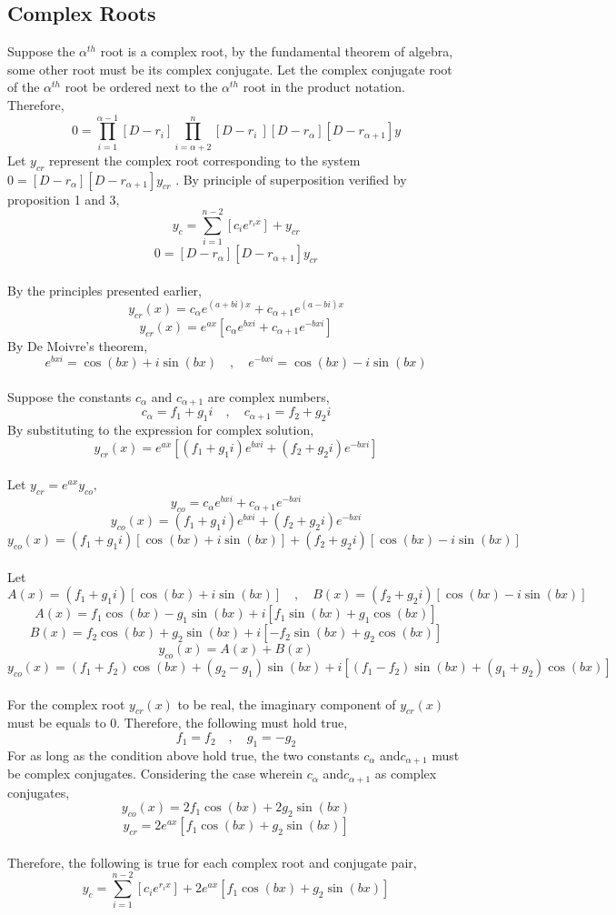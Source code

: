 \subsection{Complex Roots}
\begin{comment}
\end{comment}
Suppose the $\alpha^{th}$ root is a complex root, by the fundamental theorem of algebra, some other root must be its complex conjugate. Let the complex conjugate root of the $\alpha^{th}$ root be ordered next to the $\alpha^{th}$ root in the product notation. Therefore, 
$$0 = \prod_{i = 1}^{\alpha - 1}\left[D - r_i \right]\prod_{i = \alpha + 2}^{n}\left[D - r_i\ \right][D - r_{\alpha}][D - r_{\alpha +1 }]y$$
Let $y_{cr}$ represent the complex root corresponding to the system $0 = [D - r_{\alpha}][D - r_{\alpha +1 }]y_{cr}$ . By principle of superposition verified by proposition 1 and 3, 
$$y_c = \sum_{i = 1}^{n - 2}\left[c_i e^{r_i x}\right] + y_{cr}$$
$$0 = [D - r_{\alpha}][D - r_{\alpha +1 }]y_{cr}$$
\\By the principles presented earlier,
$$y_{cr}(x) = c_{\alpha} e^{(a + bi)x} +c_{\alpha + 1} e^{(a - bi)x}$$
$$y_{cr}(x) = e^{ax}\left[c_{\alpha} e^{bxi} +c_{\alpha + 1} e^{- bxi}\right]$$
By De Moivre's theorem,
$$e^{bxi} = \cos{(bx)} + i\sin{(bx)} \quad, \quad e^{-bxi} = \cos{(bx)} - i\sin{(bx)}$$
\\Suppose the constants $c_{\alpha}$ and $c_{\alpha + 1}$ are complex numbers,
$$c_{\alpha} = f_1 + g_1 i \quad, \quad c_{\alpha + 1} = f_2 + g_2 i$$
By substituting to the expression for complex solution,
$$y_{cr}(x) = e^{ax}\left[(f_1 + g_1 i) e^{bxi} + (f_2 + g_2 i) e^{- bxi}\right]$$
\\Let $y_{cr} = e^{ax} y_{co},$
$$y_{co} = c_{\alpha} e^{bxi} + c_{\alpha + 1} e^{- bxi}$$
$$y_{co}(x) =(f_1 + g_1 i) e^{bxi} + (f_2 + g_2 i) e^{- bxi}$$
$$y_{co}(x) =(f_1 + g_1 i)[\cos{(bx)} + i\sin{(bx)}]  + (f_2 + g_2 i) [\cos{(bx)} - i\sin{(bx)}]$$
\\Let
$$A(x) = (f_1 + g_1 i)[\cos{(bx)} + i\sin{(bx)}]\quad , \quad B(x) = (f_2 + g_2 i) [\cos{(bx)} - i\sin{(bx)}]$$
$$A(x) = f_1\cos{(bx)} - g_1 \sin{(bx)} + i[f_1\sin{(bx)} + g_1\cos{(bx)}]$$
$$ B(x) = f_2\cos{(bx)} + g_2 \sin{(bx)} + i[ - f_2\sin{(bx)} + g_2\cos{(bx)}]$$
$$y_{co}(x) = A(x) + B(x)$$
$$y_{co}(x) = (f_1 + f_2)\cos{(bx)} + (g_2 - g_1 )\sin{(bx)} + i[(f_1 - f_2)\sin{(bx)} + (g_1 + g_2)\cos{(bx)}]$$
\\For the complex root $y_{cr}(x)$ to be real, the imaginary component of $y_{cr}(x)$ must be equals to $0$. Therefore, the following must hold true,
$$f_1 = f_2 \quad, \quad g_1 = -g_2$$
For as long as the condition above hold true, the two constants $c_{\alpha}$ and$c_{\alpha + 1}$ must be complex conjugates. Considering the case wherein $c_{\alpha}$ and$c_{\alpha + 1}$ as complex conjugates,
$$y_{co}(x) = 2 f_1\cos{(bx)} + 2 g_2\sin{(bx)}$$
$$y_{cr} = 2e^{ax}[f_1\cos{(bx)} + g_2\sin{(bx)}]$$
\\Therefore, the following is true for each complex root and conjugate pair,
$$y_c = \sum_{i = 1}^{n - 2}\left[c_i e^{r_i x}\right] + 2e^{ax}[f_1\cos{(bx)} + g_2\sin{(bx)}]$$
